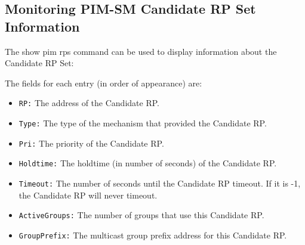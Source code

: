 \subsection{Monitoring PIM-SM Candidate RP Set Information}

The {\stt show pim rps} command can be used to display
information about the Candidate RP Set:

\vspace{0.1in}
\noindent{}
\vspace{0.1in}

The fields for each entry (in order of appearance) are:
\begin{itemize}

  \item {\tt RP:} The address of the Candidate RP.

  \item {\tt Type:} The type of the mechanism that provided the Candidate RP.

  \item {\tt Pri:} The priority of the Candidate RP.

  \item {\tt Holdtime:} The holdtime (in number of seconds) of the Candidate
  RP.

  \item {\tt Timeout:} The number of seconds until the Candidate RP timeout.
  If it is -1, the Candidate RP will never timeout.

  \item {\tt ActiveGroups:} The number of groups that use this Candidate RP.

  \item {\tt GroupPrefix:} The multicast group prefix address for this
  Candidate RP.

\end{itemize}


